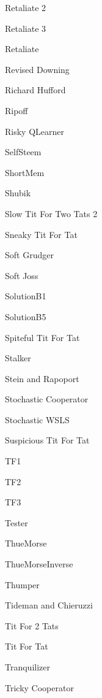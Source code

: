 \item Retaliate 2~\cite{axelrodproject}
\item Retaliate 3~\cite{axelrodproject}
\item Retaliate~\cite{axelrodproject}
\item Revised Downing~\cite{Axelrod1980a}
\item Richard Hufford~\cite{Axelrod1980b}
\item Ripoff~\cite{Ashlock2008}
\item Risky QLearner~\cite{axelrodproject}
\item SelfSteem~\cite{Andre2013}
\item ShortMem ~\cite{Andre2013}
\item Shubik~\cite{Axelrod1980a}
\item Slow Tit For Two Tats 2~\cite{prison}
\item Sneaky Tit For Tat~\cite{axelrodproject}
\item Soft Grudger~\cite{Li2011}
\item Soft Joss~\cite{prison}
\item SolutionB1~\cite{Ashlock2015}
\item SolutionB5~\cite{Ashlock2015}
\item Spiteful Tit For Tat~\cite{prison}
\item Stalker~\cite{Andre2013}
\item Stein and Rapoport~\cite{Axelrod1980a}
\item Stochastic Cooperator~\cite{Adami2013}
\item Stochastic WSLS~\cite{axelrodproject}
\item Suspicious Tit For Tat~\cite{Beaufils1997, Hilbe2013}
\item TF1~\cite{axelrodproject}
\item TF2~\cite{axelrodproject}
\item TF3~\cite{axelrodproject}
\item Tester~\cite{Axelrod1980b}
\item ThueMorse~\cite{axelrodproject}
\item ThueMorseInverse~\cite{axelrodproject}
\item Thumper~\cite{Ashlock2008}
\item Tideman and Chieruzzi
\item Tit For 2 Tats~\cite{Axelrod1981}
\item Tit For Tat~\cite{Axelrod1980a}
\item Tranquilizer~\cite{Axelrod1980a}
\item Tricky Cooperator~\cite{axelrodproject}
